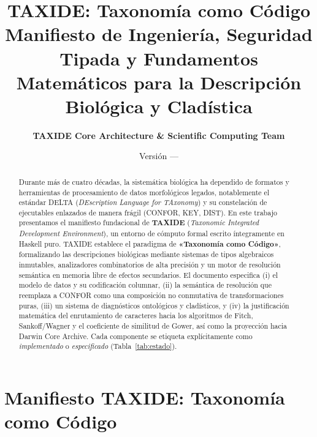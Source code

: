 \documentclass[11pt,a4paper]{article}
\title{\textbf{\Huge TAXIDE: Taxonomía como Código}\\
\Large Manifiesto de Ingeniería, Seguridad Tipada y Fundamentos Matemáticos para la Descripción Biológica y Cladística}
\author{\textbf{TAXIDE Core Architecture \& Scientific Computing Team}}
\date{Versión \taxideversion{} --- \taxidedate}
\theoremstyle{definition}
\theoremstyle{remark}
\begin{document}
\maketitle

\begin{abstract}
Durante más de cuatro décadas, la sistemática biológica ha dependido de formatos y herramientas de procesamiento de datos morfológicos legados, notablemente el estándar DELTA (\textit{DEscription Language for TAxonomy}) \cite{dallwitz1980,dallwitzpaine1986} y su constelación de ejecutables enlazados de manera frágil (CONFOR, KEY, DIST). En este trabajo presentamos el manifiesto fundacional de \textbf{TAXIDE} (\textit{Taxonomic Integrated Development Environment}), un entorno de cómputo formal escrito íntegramente en Haskell puro. TAXIDE establece el paradigma de \textbf{«Taxonomía como Código»}, formalizando las descripciones biológicas mediante sistemas de tipos algebraicos inmutables, analizadores combinatorios de alta precisión y un motor de resolución semántica en memoria libre de efectos secundarios. El documento especifica (i) el modelo de datos y su codificación columnar, (ii) la semántica de resolución que reemplaza a CONFOR como una composición no conmutativa de transformaciones puras, (iii) un sistema de diagnósticos ontológicos y cladísticos, y (iv) la justificación matemática del enrutamiento de caracteres hacia los algoritmos de Fitch, Sankoff/Wagner y el coeficiente de similitud de Gower, así como la proyección hacia Darwin Core Archive. Cada componente se etiqueta explícitamente como \emph{implementado} o \emph{especificado} (Tabla~\ref{tab:estado}).
\end{abstract}

\tableofcontents
\newpage

\section{Manifiesto TAXIDE: Taxonomía como Código}
\end{document}
